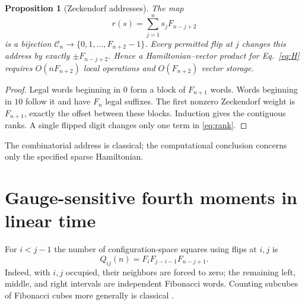 \documentclass[10pt,a4paper]{article}
\newtheorem{proposition}[theorem]{Proposition}
\newcommand{\C}{\mathcal C}
\begin{document}
\begin{proposition}[Zeckendorf addresses]\label{prop:rank}
The map
\begin{equation}\label{eq:rank}
r(s)=\sum_{j=1}^n s_j F_{n-j+2}
\end{equation}
is a bijection $\C_n\to\{0,1,\dots,F_{n+2}-1\}$. Every permitted flip at $j$ changes this address by exactly $\pm F_{n-j+2}$. Hence a Hamiltonian--vector product for Eq.~\eqref{eq:H} requires $O(nF_{n+2})$ local operations and $O(F_{n+2})$ vector storage.
\end{proposition}
\begin{proof}
Legal words beginning in $0$ form a block of $F_{n+1}$ words. Words beginning in $10$ follow it and have $F_n$ legal suffixes. The first nonzero Zeckendorf weight is $F_{n+1}$, exactly the offset between these blocks. Induction gives the contiguous ranks. A single flipped digit changes only one term in \eqref{eq:rank}.
\end{proof}
The combinatorial address is classical; the computational conclusion concerns only the specified sparse Hamiltonian.

\section{Gauge-sensitive fourth moments in linear time}
For $i<j-1$ the number of configuration-space squares using flips at $i,j$ is
\begin{equation}\label{eq:plaquettes}
Q_{ij}(n)=F_i F_{j-i-1}F_{n-j+1}.
\end{equation}
Indeed, with $i,j$ occupied, their neighbors are forced to zero; the remaining left, middle, and right intervals are independent Fibonacci words. Counting subcubes of Fibonacci cubes more generally is classical \cite{cubepoly}.
\end{document}
